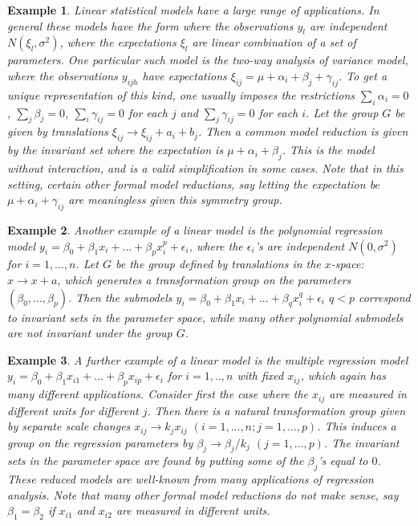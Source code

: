 \documentclass[a4paper, 11pt]{article}
\newtheorem{example}{Example}
\begin{document}
\smallskip

\begin{example}
  Linear statistical models have a large range of applications. In general these models have the form where the observations $y_l$ are independent $N(\xi_l ,\sigma^2 )$, where the expectations $\xi_l$ are linear combination of a set of parameters. One particular such model is the two-way analysis of variance model, where the observations $y_{ijh}$ have expectations $\xi_{ij}=\mu +\alpha_i +\beta_j +\gamma_{ij}$. To get a unique representation of this kind, one usually imposes the restrictions $\sum_i \alpha_i =0$, $\sum_j \beta_j =0$, $\sum_i \gamma_{ij} =0$ for each $j$ and $\sum_j \gamma_{ij} =0$ for each $i$. Let the group $G$ be given by translations $\xi_{ij}\rightarrow\xi_{ij}+a_i+b_j$. Then a common model reduction is given by the invariant set where the expectation is $\mu +\alpha_i +\beta_j $. This is the model without interaction, and is a valid simplification in some cases. Note that in this setting, certain other formal model reductions, say letting the expectation be $\mu+\alpha_i +\gamma_{ij}$ are meaningless given this symmetry group.
\end{example}

\smallskip

\begin{example}
  Another example of a linear model is the polynomial regression model $y_i =\beta_0 + \beta_1 x_i +...+\beta_p x_{i}^p +\epsilon_i$, where the $\epsilon_i$'s are independent $N(0,\sigma ^2)$ for $i=1,...,n$. Let $G$ be the group defined by translations in the $x$-space: $x\rightarrow x+a$, which generates a transformation group on the parameters $(\beta_0 ,...,\beta_p )$. Then the submodels $y_i =\beta_0 + \beta_1 x_i +...+\beta_q x_{i}^q +\epsilon_i$ $q<p$ correspond to invariant sets in the parameter space, while many other polynomial submodels are not invariant under the group $G$.
\end{example}

\smallskip

\begin{example}
  A further example of a linear model is the multiple regression model $y_i = \beta_0 +\beta_1 x_{i1}+...+\beta_p x_{ip} +\epsilon_i $ for $i=1,..,n$ with fixed $x_{ij}$, which again has many different applications. Consider first the case where the $x_{ij}$ are measured in different units for different $j$. Then there is a natural transformation group given by separate scale changes $x_{ij}\rightarrow k_j x_{ij}$ $(i=1,...,n; j=1,...,p)$. This induces a group on the regression parameters by $\beta_j \rightarrow \beta_j /k_j $ $(j=1,...,p)$. The invariant sets in the parameter space are found by putting some of the $\beta_j$'s equal to $0$. These reduced models are well-known from many applications of regression analysis. Note that many other formal model reductions do not make sense, say $\beta_1=\beta_2$ if $x_{i1}$ and $x_{i2}$ are measured in different units.
\end{example}
\end{document}
